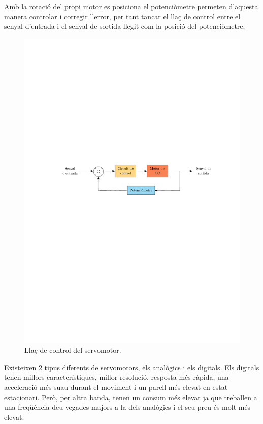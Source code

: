 Amb la rotació del propi motor es posiciona el potenciòmetre permeten d’aquesta manera controlar i corregir l’error, per tant tancar el llaç de control entre el senyal d’entrada i el senyal de sortida llegit com la posició del potenciòmetre. 


\begin{figure}[H]
	\centering
	\includegraphics{flux_servo}
	\caption{Llaç de control del servomotor.}
	\label{fig:llacservo}
\end{figure}

Existeixen 2 tipus diferents de servomotors, els analògics i els digitals. Els digitals tenen millors característiques, millor resolució, resposta més ràpida, una acceleració més suau durant el moviment i un parell més elevat en estat estacionari. Però, per altra banda, tenen un consum més elevat ja que treballen a una freqüència deu vegades majors a la dels analògics i el seu preu és molt més elevat. 

